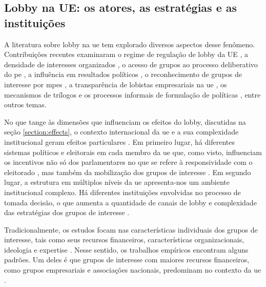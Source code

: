 \subsection{Lobby na UE: os atores, as estratégias e as instituições}
\label{section:lobbyUE}

A literatura sobre lobby na \acrshort{ue} tem explorado diversos aspectos desse fenômeno. Contribuições recentes examinaram o regime de regulação de lobby da UE \cite{bunea2019regulating, bunea2018legitimacy}, a densidade de interesses organizados \cite{carroll2020cultural}, o acesso de grupos ao processo deliberativo do \acrshort{pe} \cite{coen2019legislative}, a influência em resultados políticos \cite{kluver2015legislative, marshall2010lobby}, o reconhecimento de grupos de interesse por \acrshort{mpe}s \cite{Ibenskas2021}, a transparência de lobistas empresariais na \acrshort{ue} \cite{naurin2007deliberation}, os mecanismos de trílogos e os processos informais de formulação de políticas \cite{brandsma2019transparency, leino2017search}, entre outros temas.

No que tange às dimensões que influenciam os efeitos do lobby, discutidas na seção \ref{section:effects}, o contexto internacional da \acrshort{ue} e a sua complexidade institucional geram efeitos particulares \cite{kluver2015legislative}. Em primeiro lugar, há diferentes sistemas políticos e eleitorais em cada membro da \acrshort{ue} que, como visto, influenciam os incentivos não só dos parlamentares no que se refere à responsividade com o eleitorado \cite{mahoney_lobbying_2007}, mas também da mobilização dos grupos de interesse \cite{kluver2015legislative}. Em segundo lugar, a estrutura em múltiplos níveis da \acrshort{ue} apresenta-nos um ambiente institucional complexo. Há diferentes instituições envolvidas no processo de tomada decisão, o que aumenta a quantidade de canais de lobby e complexidade das estratégias dos grupos de interesse \cite{richardson2000government,eising2007institutional, coen2019legislative}. 

Tradicionalmente, os estudos focam nas características individuais dos grupos de interesse, tais como seus recursos financeiros, características organizacionais, ideologia e expertise \cite{Bouwen2002, dur2007question, eising2007institutional}. Nesse sentido, os trabalhos empíricos encontram alguns padrões. Um deles é que grupos de interesse com maiores recursos financeiros, como grupos empresariais e associações nacionais, predominam no contexto da \acrshort{ue} \cite{dur20212wholobbies, eising2007institutional}.

